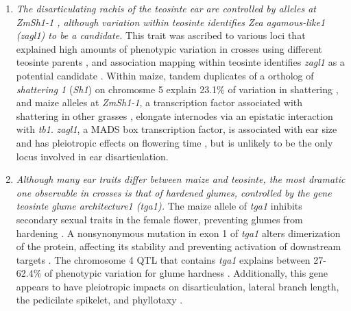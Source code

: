 \documentclass[9pt,twocolumn,twoside]{rilabRxiv}
\begin{document}
\begin{enumerate}
\item \textit{The disarticulating rachis of the teosinte ear are controlled by alleles at \textit{ZmSh1-1} , although variation within teosinte identifies \textit{Zea agamous-like1} (\textit{zagl1}) to be a candidate.}
 This trait was ascribed to various loci that explained high amounts of phenotypic variation in crosses using different teosinte parents \citep{doebley1991, doebley1993}, and association mapping within teosinte identifies \textit{zagl1} as a potential candidate \citep{weber2008}.
 Within maize, tandem duplicates of a ortholog of \textit{shattering 1} (\textit{Sh1}) on chromosme 5 explain 23.1\% of variation in shattering \citep{lin2012}, and maize alleles at \textit{ZmSh1-1}, a transcription factor associated with shattering in other grasses \citep{lin2012}, elongate internodes via an epistatic interaction with \textit{tb1}\citep{yang2016}.
 \textit{zagl1}, a MADS box transcription factor, is associated with ear size and has pleiotropic effects on flowering time \citep{wills2017}, but is unlikely to be the only locus involved in ear disarticulation.

\item \textit{Although many ear traits differ between maize and teosinte, the most dramatic one observable in crosses is that of hardened glumes, controlled by the gene \textit{teosinte glume architecture1} (\textit{tga1}).}
 The maize allele of \textit{tga1} inhibits secondary sexual traits in the female flower, preventing glumes from hardening \citep{preston2012}.
 A nonsynonymous mutation in exon 1 of \textit{tga1} alters dimerization of the protein, affecting its stability and preventing activation of downstream targets \citep{wang2015}.
 The chromosome 4 QTL that contains \textit{tga1}  explains between 27-62.4\% of phenotypic variation for glume hardness \citep{doebley1991, doebley1993, briggs2007}.
 Additionally, this gene appears to have pleiotropic impacts on disarticulation, lateral branch length, the pedicilate spikelet, and phyllotaxy \citep{wang2015}.


\end{enumerate}
\end{document}
